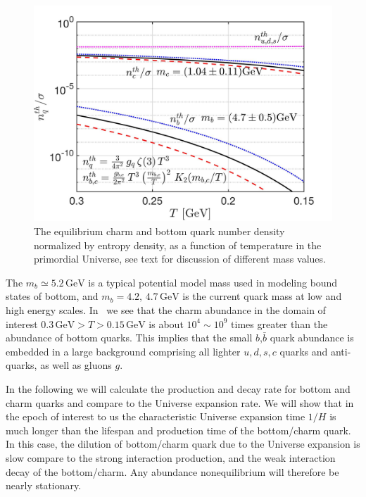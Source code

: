 \begin{figure}
\centerline{\includegraphics[width=0.8\linewidth]{./plots/bcQuarkDensity_new}}
\caption{
The equilibrium charm and bottom quark number density normalized by entropy density, as a function of temperature in the primordial Universe, see text for discussion of different mass values. }
\label{number_entropy_b002} 
\end{figure}

The $m_b\simeq 5.2\,\mathrm{GeV}$ is a typical potential model mass used in modeling bound states of bottom, and $m_b=4.2,\,4.7\,\mathrm{GeV}$ is the current quark mass at low and high energy scales. In~ we see that the charm abundance in the domain of interest $0.3\,\mathrm{GeV}>T>0.15\,\mathrm{GeV}$ is about $10^4\sim 10^{9}$ times greater than the abundance of bottom quarks. This implies that the small $b$,$\bar b$ quark abundance is embedded in a large background comprising all lighter $u,d,s,c$ quarks and anti-quarks, as well as gluons $g$.

In the following we will calculate the production and decay rate for bottom and charm quarks and compare to the Universe expansion rate. We will show that in the epoch of interest to us the characteristic Universe expansion time $1/H$ is much longer than the lifespan and production time of the bottom/charm quark. In this case, the dilution of bottom/charm quark due to the Universe expansion is slow compare to the strong interaction production, and the weak interaction decay of the bottom/charm. Any abundance nonequilibrium will therefore be nearly stationary. 

